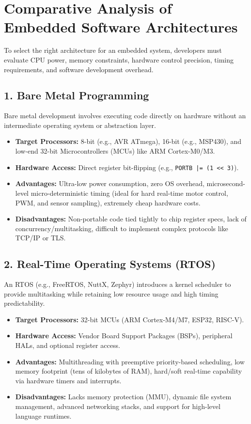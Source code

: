 \section{Comparative Analysis of Embedded Software Architectures}

To select the right architecture for an embedded system, developers must evaluate CPU power, memory constraints, hardware control precision, timing requirements, and software development overhead.

\subsection{1. Bare Metal Programming}
Bare metal development involves executing code directly on hardware without an intermediate operating system or abstraction layer.
\begin{itemize}[leftmargin=*]
    \item \textbf{Target Processors:} 8-bit (e.g., AVR ATmega), 16-bit (e.g., MSP430), and low-end 32-bit Microcontrollers (MCUs) like ARM Cortex-M0/M3.
    \item \textbf{Hardware Access:} Direct register bit-flipping (e.g., \texttt{PORTB |= (1 << 3)}).
    \item \textbf{Advantages:} Ultra-low power consumption, zero OS overhead, microsecond-level micro-deterministic timing (ideal for hard real-time motor control, PWM, and sensor sampling), extremely cheap hardware costs.
    \item \textbf{Disadvantages:} Non-portable code tied tightly to chip register specs, lack of concurrency/multitasking, difficult to implement complex protocols like TCP/IP or TLS.
\end{itemize}

\subsection{2. Real-Time Operating Systems (RTOS)}
An RTOS (e.g., FreeRTOS, NuttX, Zephyr) introduces a kernel scheduler to provide multitasking while retaining low resource usage and high timing predictability.
\begin{itemize}[leftmargin=*]
    \item \textbf{Target Processors:} 32-bit MCUs (ARM Cortex-M4/M7, ESP32, RISC-V).
    \item \textbf{Hardware Access:} Vendor Board Support Packages (BSPs), peripheral HALs, and optional register access.
    \item \textbf{Advantages:} Multithreading with preemptive priority-based scheduling, low memory footprint (tens of kilobytes of RAM), hard/soft real-time capability via hardware timers and interrupts.
    \item \textbf{Disadvantages:} Lacks memory protection (MMU), dynamic file system management, advanced networking stacks, and support for high-level language runtimes.
\end{itemize}

